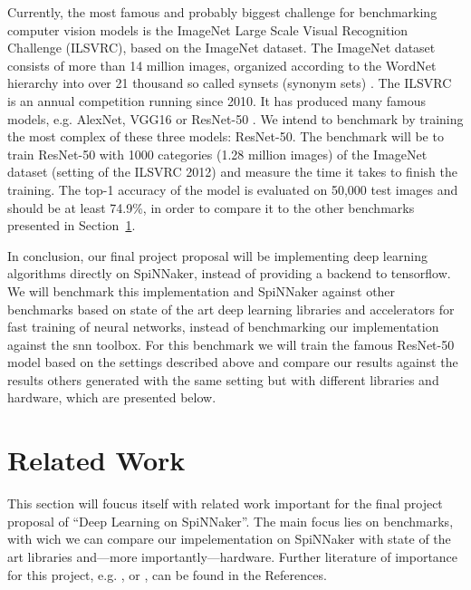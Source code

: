 \documentclass{article}
\begin{document}
Currently, the most famous and probably biggest challenge
for benchmarking computer vision models is the
ImageNet Large Scale Visual Recognition Challenge (ILSVRC),
based on the ImageNet dataset.
The ImageNet dataset consists of more than 14 million
images, organized according to the WordNet hierarchy into
over 21 thousand so called synsets (synonym sets)
\citep{imagenet, wordnet}.
The ILSVRC is an annual competition running since 2010.
It has produced many famous models, e.g. AlexNet, VGG16 or
ResNet-50 \citep{alexnet, simonyan_et_al_2014,
  he_et_al_2015}.
We intend to benchmark by training the most complex of
these three models: ResNet-50.
The benchmark will be to train ResNet-50 with 1000
categories (1.28 million images) of the ImageNet dataset
(setting of the ILSVRC 2012) and measure the time it takes
to finish the training.
The top-1 accuracy of the model is evaluated on 50,000 test
images and should be at least 74.9\%, in order to compare
it to the other benchmarks presented in
Section~\ref{sec:related_work}.

In conclusion, our final project proposal will be
implementing deep learning algorithms directly on
SpiNNaker, instead of providing a backend to tensorflow.
We will benchmark this implementation and SpiNNaker against
other benchmarks based on state of the art deep learning
libraries and accelerators for fast training of neural
networks, instead of benchmarking our implementation
against the snn toolbox.
For this benchmark we will train the famous ResNet-50 model
based on the settings described above and compare our
results against the results others generated with the same
setting but with different libraries and hardware, which
are presented below.


\section{Related Work} %
\label{sec:related_work}

This section will foucus itself with related work important
for the final project proposal of ``Deep Learning on
SpiNNaker''.
The main focus lies on benchmarks, with wich we can compare
our impelementation on SpiNNaker with state of the art
libraries and---more importantly---hardware.
Further literature of importance for this project, e.g.
\citet{he_et_al_2015}, \citet{goodfellow2016} or
\citet{imagenet}, can be found in the References.
\end{document}
